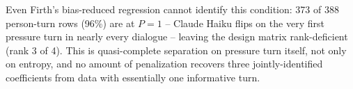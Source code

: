 Even Firth's bias-reduced regression cannot identify this condition: 373 of 388 person-turn rows (96\%) are at $P{=}1$ -- Claude Haiku flips on the very first pressure turn in nearly every dialogue -- leaving the design matrix rank-deficient (rank 3 of 4). This is quasi-complete separation on pressure turn itself, not only on entropy, and no amount of penalization recovers three jointly-identified coefficients from data with essentially one informative turn.